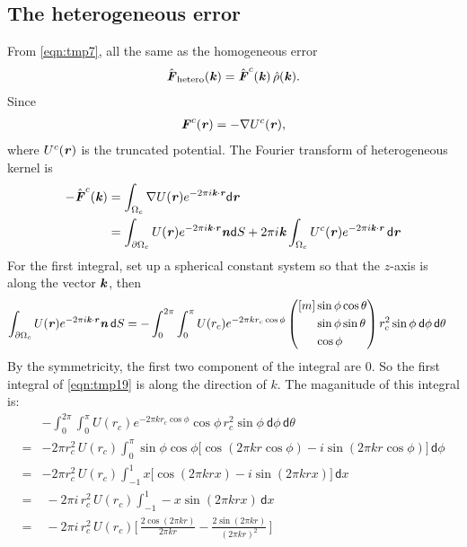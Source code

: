 \documentclass[aps,pre,preprint,unsortedaddress]{revtex4}
\renewcommand{\v}[1]{\textbf{\textit{#1}}}
\renewcommand{\d}[1]{\textsf{#1}}
\begin{document}
\subsection{The heterogeneous error}
From \eqref{eqn:tmp7},
all the same as the homogeneous error
\begin{align}
  \hat{\v F}_{\textrm{hetero}}(\v k) = \hat{\v F}^c(\v k)\,\hat\rho(\v k).
\end{align}
Since
\begin{align}
  \v F^c(\v r) = - \nabla U^c(\v r),
\end{align}
where $U^c(\v r)$ is the truncated potential. The Fourier transform of
heterogeneous kernel is
\begin{align}\nonumber
  -\hat{\v F}^c(\v k) 
  & =
  \int_{\Omega_c}\nabla U(\v r) e^{-2\pi i\v k\cdot\v r}\d d\v r \\ \label{eqn:tmp19}
  & =
  \int_{\partial\Omega_c}U(\v r) e^{-2\pi i\v k\cdot\v r} \v n\d dS
  + 2\pi i \v k\int_{\Omega_c} U^c(\v r) e^{-2\pi i\v k\cdot\v r}\,\d d\v r
\end{align}
For the first integral, set up a spherical constant system so that the
$z$-axis is along the vector $\v k$, then
\begin{align}
  \int_{\partial\Omega_c}U(\v r) e^{-2\pi i\v k\cdot\v r} \v n\,\d dS
  & =
  - \int_0^{2\pi}\int_0^{\pi}
  U(r_c) e^{-2\pi k r_c\cos\phi}
\left(
\begin{aligned}[m]
  &\sin\phi\cos\theta\\
  &\sin\phi\sin\theta\\
  &\cos\phi
\end{aligned}
\right)
r_c^2\sin\phi\:
\d d\phi\,
\d d\theta
\end{align}
By the symmetricity, the first two component of the integral are 0. So
the first integral of \eqref{eqn:tmp19} is along the direction of
$k$. The maganitude of this integral is:
\begin{align}\nonumber
  &- \int_0^{2\pi}\int_0^{\pi}
  U(r_c) e^{-2\pi k r_c\cos\phi}
  \cos\phi\,
  r_c^2\sin\phi\:
  \d d\phi\,
  \d d\theta\\\nonumber
  = &
  -2\pi r_c^2\,U(r_c)
  \int_0^\pi\sin\phi\cos\phi
  \big[\cos(2\pi kr\cos\phi) - i\sin(2\pi kr\cos\phi)\big]
  \,\d d\phi \\\nonumber
  = &
  -2\pi r_c^2\,U(r_c)
  \int_{-1}^1 x \big[\cos(2\pi krx) - i\sin(2\pi krx)\big]
  \,\d dx \\ \nonumber
  = &\;
  -2\pi i\, r_c^2\,U(r_c)
  \int_{-1}^1 -x\sin(2\pi krx)
  \,\d dx \\ 
  = &\;
  -2\pi i\, r_c^2\,U(r_c)
  \bigg[\,
  \frac{2\cos(2\pi kr)}{2\pi kr}
  -\frac{2\sin(2\pi kr)}{(2\pi kr)^2}
  \,\bigg]
\end{align}
\end{document}
